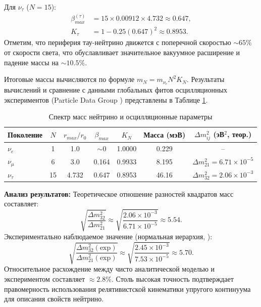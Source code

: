 \documentclass[11pt,a4paper]{article}
\begin{document}
	Для $\nu_\tau$ ($N=15$):
	\begin{align}
		\beta_{max}^{(\tau)} &= 15 \times 0.00912 \times 4.732 \approx 0.647, \\
		K_\tau &= 1 - 0.25 (0.647)^2 \approx 0.8953.
	\end{align}
	Отметим, что периферия тау-нейтрино движется с поперечной скоростью $\sim 65\%$ от скорости света, что обуславливает значительное вакуумное расширение и падение массы на $\sim 10.5\%$.
	
	Итоговые массы вычисляются по формуле $m_N = m_{\nu_e} N^2 K_N$. Результаты вычислений и сравнение с данными глобальных фитов осцилляционных экспериментов (Particle Data Group \cite{pdg2024}) представлены в Таблице \ref{tab:neutrino}.
	
	\begin{table}[h]
		\centering
		\caption{Спектр масс нейтрино и осцилляционные параметры}
		\label{tab:neutrino}
		\renewcommand{\arraystretch}{1.3}
		\begin{tabular}{lcccccc}
			\toprule
			Поколение & $N$ & $r_{max}/r_0$ & $\beta_{max}$ & $K_N$ & Масса (мэВ) & $\Delta m^2_{ij}$ (эВ$^2$, теор.) \\
			\midrule
			$\nu_e$   & 1   & 1.0     & $\sim 0$ & 1.0000 & 0.229 & -- \\
			$\nu_\mu$ & 6   & 3.0     & 0.164    & 0.9933 & 8.195 & $\Delta m^2_{21} = 6.71 \times 10^{-5}$ \\
			$\nu_\tau$ & 15 & 4.732   & 0.647    & 0.8953 & 46.16 & $\Delta m^2_{32} = 2.06 \times 10^{-3}$ \\
			\bottomrule
		\end{tabular}
	\end{table}
	
	\textbf{Анализ результатов:}
	Теоретическое отношение разностей квадратов масс составляет:
	\begin{equation}
		\sqrt{\frac{\Delta m^2_{32}}{\Delta m^2_{21}}} \approx \sqrt{\frac{2.06 \times 10^{-3}}{6.71 \times 10^{-5}}} \approx 5.54.
	\end{equation}
	Экспериментально наблюдаемое значение (нормальная иерархия, \cite{pdg2024}):
	\begin{equation}
		\sqrt{\frac{\Delta m^2_{32}(\text{exp})}{\Delta m^2_{21}(\text{exp})}} \approx \sqrt{\frac{2.45 \times 10^{-3}}{7.53 \times 10^{-5}}} \approx 5.70.
	\end{equation}
	Относительное расхождение между чисто аналитической моделью и экспериментом составляет $\approx 2.8\%$. Столь высокая точность подтверждает правомерность использования релятивистской кинематики упругого континуума для описания свойств нейтрино.
\end{document}
